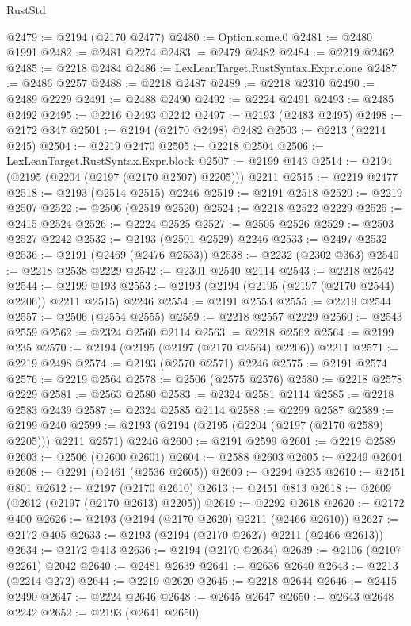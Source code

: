 \begin{lexlean}{RustStd}
\begin{coremodule}
@2479 := @2194 (@2170 @2477)
@2480 := Option.some.{0}
@2481 := @2480 @1991
@2482 := @2481 @2274
@2483 := @2479 @2482
@2484 := @2219 @2462
@2485 := @2218 @2484
@2486 := LexLeanTarget.RustSyntax.Expr.clone
@2487 := @2486 @2257
@2488 := @2218 @2487
@2489 := @2218 @2310
@2490 := @2489 @2229
@2491 := @2488 @2490
@2492 := @2224 @2491
@2493 := @2485 @2492
@2495 := @2216 @2493 @2242
@2497 := @2193 (@2483 @2495)
@2498 := @2172 @347
@2501 := @2194 (@2170 @2498) @2482
@2503 := @2213 (@2214 @245)
@2504 := @2219 @2470
@2505 := @2218 @2504
@2506 := LexLeanTarget.RustSyntax.Expr.block
@2507 := @2199 @143
@2514 := @2194 (@2195 (@2204 (@2197 (@2170 @2507) @2205))) @2211
@2515 := @2219 @2477
@2518 := @2193 (@2514 @2515) @2246
@2519 := @2191 @2518
@2520 := @2219 @2507
@2522 := @2506 (@2519 @2520)
@2524 := @2218 @2522 @2229
@2525 := @2415 @2524
@2526 := @2224 @2525
@2527 := @2505 @2526
@2529 := @2503 @2527 @2242
@2532 := @2193 (@2501 @2529) @2246
@2533 := @2497 @2532
@2536 := @2191 (@2469 (@2476 @2533))
@2538 := @2232 (@2302 @363)
@2540 := @2218 @2538 @2229
@2542 := @2301 @2540 @2114
@2543 := @2218 @2542
@2544 := @2199 @193
@2553 := @2193 (@2194 (@2195 (@2197 (@2170 @2544) @2206)) @2211 @2515) @2246
@2554 := @2191 @2553
@2555 := @2219 @2544
@2557 := @2506 (@2554 @2555)
@2559 := @2218 @2557 @2229
@2560 := @2543 @2559
@2562 := @2324 @2560 @2114
@2563 := @2218 @2562
@2564 := @2199 @235
@2570 := @2194 (@2195 (@2197 (@2170 @2564) @2206)) @2211
@2571 := @2219 @2498
@2574 := @2193 (@2570 @2571) @2246
@2575 := @2191 @2574
@2576 := @2219 @2564
@2578 := @2506 (@2575 @2576)
@2580 := @2218 @2578 @2229
@2581 := @2563 @2580
@2583 := @2324 @2581 @2114
@2585 := @2218 @2583 @2439
@2587 := @2324 @2585 @2114
@2588 := @2299 @2587
@2589 := @2199 @240
@2599 := @2193 (@2194 (@2195 (@2204 (@2197 (@2170 @2589) @2205))) @2211 @2571) @2246
@2600 := @2191 @2599
@2601 := @2219 @2589
@2603 := @2506 (@2600 @2601)
@2604 := @2588 @2603
@2605 := @2249 @2604
@2608 := @2291 (@2461 (@2536 @2605))
@2609 := @2294 @235
@2610 := @2451 @801
@2612 := @2197 (@2170 @2610)
@2613 := @2451 @813
@2618 := @2609 (@2612 (@2197 (@2170 @2613) @2205))
@2619 := @2292 @2618
@2620 := @2172 @400
@2626 := @2193 (@2194 (@2170 @2620) @2211 (@2466 @2610))
@2627 := @2172 @405
@2633 := @2193 (@2194 (@2170 @2627) @2211 (@2466 @2613))
@2634 := @2172 @413
@2636 := @2194 (@2170 @2634)
@2639 := @2106 (@2107 @2261) @2042
@2640 := @2481 @2639
@2641 := @2636 @2640
@2643 := @2213 (@2214 @272)
@2644 := @2219 @2620
@2645 := @2218 @2644
@2646 := @2415 @2490
@2647 := @2224 @2646
@2648 := @2645 @2647
@2650 := @2643 @2648 @2242
@2652 := @2193 (@2641 @2650)

\end{coremodule}
\end{lexlean}
